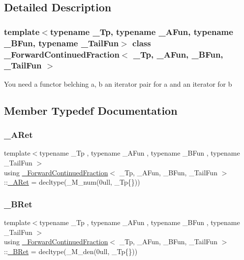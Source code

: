\subsection{Detailed Description}
\subsubsection*{template$<$typename \+\_\+\+Tp, typename \+\_\+\+A\+Fun, typename \+\_\+\+B\+Fun, typename \+\_\+\+Tail\+Fun$>$\newline
class \+\_\+\+Forward\+Continued\+Fraction$<$ \+\_\+\+Tp, \+\_\+\+A\+Fun, \+\_\+\+B\+Fun, \+\_\+\+Tail\+Fun $>$}

You need a functor belching a, b an iterator pair for a and an iterator for b 

\subsection{Member Typedef Documentation}
\mbox{\label{class__ForwardContinuedFraction_aa3cd354821d01eff12c24f0c4283b6ee}} 
\subsubsection{\texorpdfstring{\+\_\+\+A\+Ret}{\_ARet}}
{\footnotesize\ttfamily template$<$typename \+\_\+\+Tp , typename \+\_\+\+A\+Fun , typename \+\_\+\+B\+Fun , typename \+\_\+\+Tail\+Fun $>$ \\
using \hyperlink{class__ForwardContinuedFraction}{\+\_\+\+Forward\+Continued\+Fraction}$<$ \+\_\+\+Tp, \+\_\+\+A\+Fun, \+\_\+\+B\+Fun, \+\_\+\+Tail\+Fun $>$\+::\hyperlink{class__ForwardContinuedFraction_aa3cd354821d01eff12c24f0c4283b6ee}{\+\_\+\+A\+Ret} =  decltype(\+\_\+\+M\+\_\+num(0ull, \+\_\+\+Tp\{\}))}

\mbox{\label{class__ForwardContinuedFraction_a0353d4790204b04fca698a26fa9a7d0b}} 
\subsubsection{\texorpdfstring{\+\_\+\+B\+Ret}{\_BRet}}
{\footnotesize\ttfamily template$<$typename \+\_\+\+Tp , typename \+\_\+\+A\+Fun , typename \+\_\+\+B\+Fun , typename \+\_\+\+Tail\+Fun $>$ \\
using \hyperlink{class__ForwardContinuedFraction}{\+\_\+\+Forward\+Continued\+Fraction}$<$ \+\_\+\+Tp, \+\_\+\+A\+Fun, \+\_\+\+B\+Fun, \+\_\+\+Tail\+Fun $>$\+::\hyperlink{class__ForwardContinuedFraction_a0353d4790204b04fca698a26fa9a7d0b}{\+\_\+\+B\+Ret} =  decltype(\+\_\+\+M\+\_\+den(0ull, \+\_\+\+Tp\{\}))}

